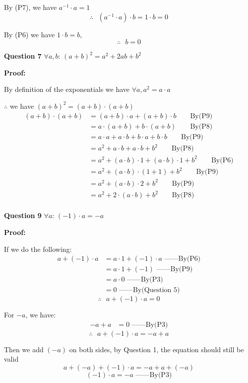 \documentclass[a4paper,12pt]{report}
\begin{document}
\noindent
By (P7), we have $a^{-1}\cdot{a} = 1$\[\therefore \text{ }(a^{-1}\cdot{a})\cdot{b} = 1\cdot{b} = 0\]

\noindent
By (P6) we have $1\cdot{b} = b$,\[\therefore \text{ } b = 0\]

\noindent
\textbf{Question 7} $\forall a,b$: $(a+b)^2=a^2+2ab+b^2$

\noindent
\textbf{Proof:}

\noindent
By definition of the exponentials we have $\forall a, a^2 = a\cdot{a}$

\noindent
$\therefore$ we have $(a+b)^2 = (a+b)\cdot{(a+b)}$
\begin{align*}
 (a+b)\cdot{(a+b)} & = (a+b)\cdot{a} + (a+b)\cdot{b}\qquad \text{By(P9)}\\
      & = a\cdot{(a+b)} + b\cdot{(a+b)} \qquad \text{By(P8)}\\
      & = a\cdot{a} + a\cdot{b} + b\cdot{a} + b\cdot{b} \qquad \text{By(P9)}\\
      & = a^2 + a\cdot{b} + a\cdot{b} + b^2 \qquad \text{By(P8)}\\
      & = a^2 + (a\cdot{b})\cdot{1} + (a\cdot{b})\cdot{1} + b^2 \qquad \text{By(P6)}\\
      & = a^2 + (a\cdot{b})\cdot{(1+1)} + b^2 \qquad \text{By(P9)}\\
      & = a^2 + (a\cdot{b})\cdot{2} + b^2 \qquad \text{By(P9)}\\
      & = a^2 + 2\cdot{(a\cdot{b})} + b^2\qquad \text{By(P8)}\\
\end{align*}

\noindent
\textbf{Question 9} $\forall a$: $(-1)\cdot{a}=-a$

\noindent
\textbf{Proof:}

\noindent
If we do the following: 
\begin{align*}
 a + (-1)\cdot{a} & = a\cdot{1} + (-1)\cdot{a} \text{ ------By(P6)}\\
      & = a\cdot{1+(-1)} \text{ ------By(P9)}\\
      & = a\cdot{0} \text{ ------By(P3)}\\
      & = 0 \text{ ------By(Question 5)}
\end{align*}
\[\therefore \text{ } a + (-1)\cdot{a} = 0\]

For $-a$, we have:
\begin{align*}
 -a + a & = 0 \text{ ------By(P3)}
\end{align*}
\[\therefore \text{ } a + (-1)\cdot{a} =  -a + a\]

\noindent
Then we add $(-a)$ on both sides, by Question 1, the equation should still be valid
\[a  +(-a) + (-1)\cdot{a} =  -a + a +(-a)\]
\[(-1)\cdot{a}=-a\text{ ------By(P3)}\]
\end{document}
